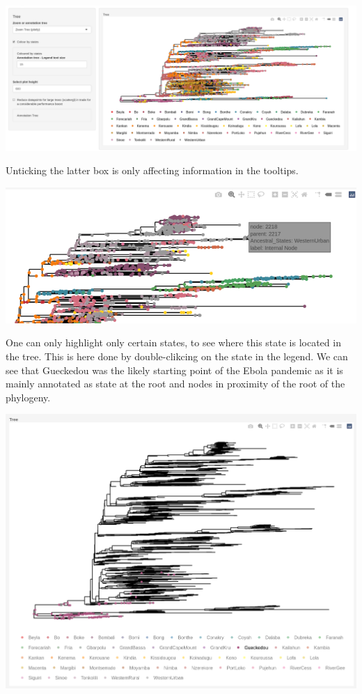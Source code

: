 \documentclass[
]{article}
\begin{document}
\includegraphics{tutorial_img/coloured_tree.png}

Unticking the latter box is only affecting information in the tooltips.

\includegraphics{tutorial_img/tooltip.png}

One can only highlight only certain states, to see where this state is
located in the tree. This is here done by double-clikcing on the state
in the legend. We can see that Gueckedou was the likely starting point
of the Ebola pandemic as it is mainly annotated as state at the root and
nodes in proximity of the root of the phylogeny.

\includegraphics{tutorial_img/Gueckedou.png}
\end{document}
